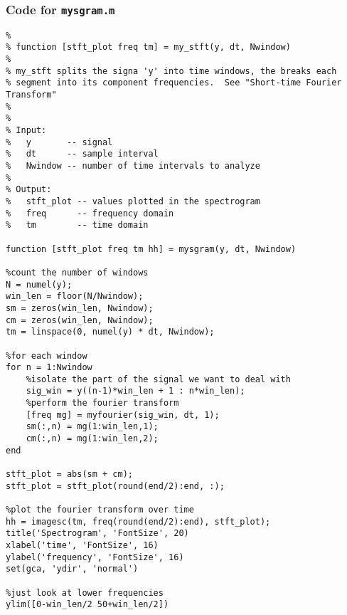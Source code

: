\documentclass{article}
\begin{document}
\subsubsection*{Code for {\tt mysgram.m}}
\begin{verbatim}
%
% function [stft_plot freq tm] = my_stft(y, dt, Nwindow)
%
% my_stft splits the signa 'y' into time windows, the breaks each 
% segment into its component frequencies.  See "Short-time Fourier Transform"
% 
%
% Input: 
%   y       -- signal
%   dt      -- sample interval
%   Nwindow -- number of time intervals to analyze
%
% Output:
%   stft_plot -- values plotted in the spectrogram
%   freq      -- frequency domain
%   tm        -- time domain

function [stft_plot freq tm hh] = mysgram(y, dt, Nwindow)

%count the number of windows
N = numel(y);
win_len = floor(N/Nwindow);
sm = zeros(win_len, Nwindow);
cm = zeros(win_len, Nwindow);
tm = linspace(0, numel(y) * dt, Nwindow);

%for each window
for n = 1:Nwindow 
    %isolate the part of the signal we want to deal with
    sig_win = y((n-1)*win_len + 1 : n*win_len);
    %perform the fourier transform
    [freq mg] = myfourier(sig_win, dt, 1);
    sm(:,n) = mg(1:win_len,1);
    cm(:,n) = mg(1:win_len,2);
end

stft_plot = abs(sm + cm);
stft_plot = stft_plot(round(end/2):end, :);

%plot the fourier transform over time
hh = imagesc(tm, freq(round(end/2):end), stft_plot);
title('Spectrogram', 'FontSize', 20)
xlabel('time', 'FontSize', 16)
ylabel('frequency', 'FontSize', 16)
set(gca, 'ydir', 'normal')

%just look at lower frequencies
ylim([0-win_len/2 50+win_len/2])
\end{verbatim}
\end{document}
